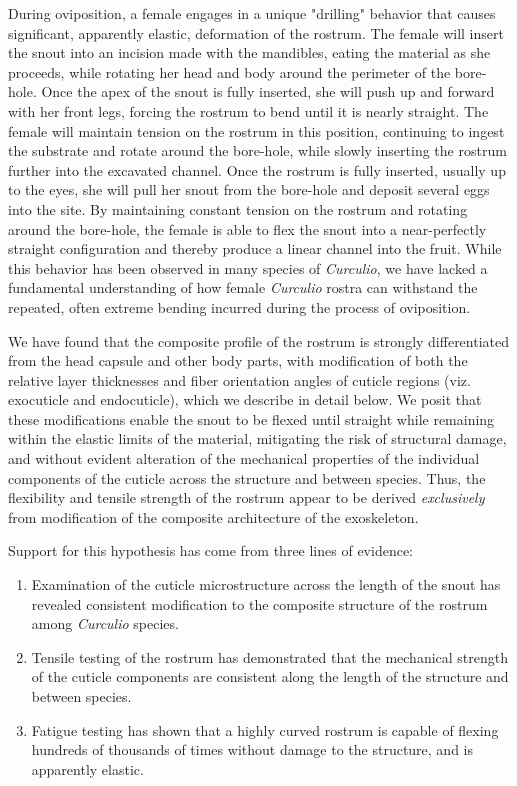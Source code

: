 \documentclass[twocolumn, linenumbers, superscriptaddress]{revtex4-1}
\begin{document}
	During oviposition, a female engages in a unique "drilling" behavior that causes significant, apparently elastic, deformation of the rostrum.
	The female will insert the snout into an incision made with the mandibles, eating the material as she proceeds, while rotating her head and body around the perimeter of the bore-hole.
	Once the apex of the snout is fully inserted, she will push up and forward with her front legs, forcing the rostrum to bend until it is nearly straight.
	The female will maintain tension on the rostrum in this position, continuing to ingest the substrate and rotate around the bore-hole, while slowly inserting the rostrum further into the excavated channel.
	Once the rostrum is fully inserted, usually up to the eyes, she will pull her snout from the bore-hole and deposit several eggs into the site.
	By maintaining constant tension on the rostrum and rotating around the bore-hole, the female is able to flex the snout into a near-perfectly straight configuration and thereby produce a linear channel into the fruit.
	While this behavior has been observed in many species of \textit{Curculio}, we have lacked a fundamental understanding of how female \textit{Curculio} rostra can withstand the repeated, often extreme bending incurred during the process of oviposition.

	We have found that the composite profile of the rostrum is strongly differentiated from the head capsule and other body parts, with modification of both the relative layer thicknesses and fiber orientation angles of cuticle regions (viz. exocuticle and endocuticle), which we describe in detail below.
	We posit that these modifications enable the snout to be flexed until straight while remaining within the elastic limits of the material, mitigating the risk of structural damage, and without evident alteration of the mechanical properties of the individual components of the cuticle across the structure and between species.
	Thus, the flexibility and tensile strength of the rostrum appear to be derived \emph{exclusively} from modification of the composite architecture of the exoskeleton.
	
	Support for this hypothesis has come from three lines of evidence:
	
	\begin{enumerate}
	\item Examination of the cuticle microstructure across the length of the snout has revealed consistent modification to the composite structure of the rostrum among \textit{Curculio} species.
	\item Tensile testing of the rostrum has demonstrated that the mechanical strength of the cuticle components are consistent along the length of the structure and between species.
	\item Fatigue testing has shown that a highly curved rostrum is capable of flexing hundreds of thousands of times without damage to the structure, and is apparently elastic.
	\end{enumerate}
	
\end{document}
